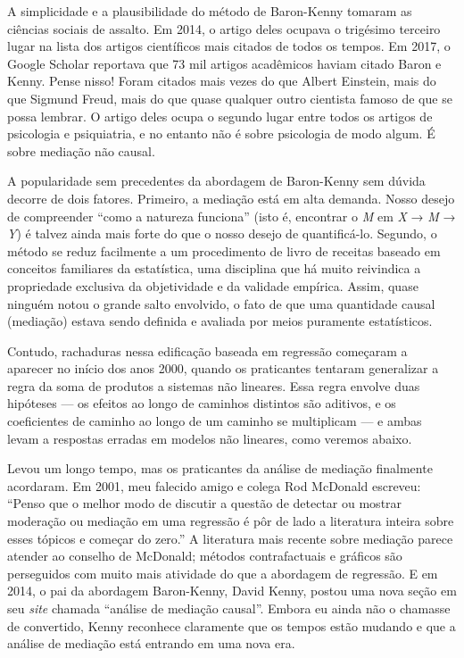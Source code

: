 \documentclass[11pt,a5paper,twoside]{book}
\begin{document}
A simplicidade e a plausibilidade do método de Baron-Kenny tomaram as ciências sociais de assalto. Em 2014, o artigo deles ocupava o trigésimo terceiro lugar na lista dos artigos científicos mais citados de todos os tempos. Em 2017, o Google Scholar reportava que 73 mil artigos acadêmicos haviam citado Baron e Kenny. Pense nisso! Foram citados mais vezes do que Albert Einstein, mais do que Sigmund Freud, mais do que quase qualquer outro cientista famoso de que se possa lembrar. O artigo deles ocupa o segundo lugar entre todos os artigos de psicologia e psiquiatria, e no entanto não é sobre psicologia de modo algum. É sobre mediação não causal.

A popularidade sem precedentes da abordagem de Baron-Kenny sem dúvida decorre de dois fatores. Primeiro, a mediação está em alta demanda. Nosso desejo de compreender “como a natureza funciona” (isto é, encontrar o \textit{M} em \textit{X} → \textit{M} → \textit{Y}) é talvez ainda mais forte do que o nosso desejo de quantificá-lo. Segundo, o método se reduz facilmente a um procedimento de livro de receitas baseado em conceitos familiares da estatística, uma disciplina que há muito reivindica a propriedade exclusiva da objetividade e da validade empírica. Assim, quase ninguém notou o grande salto envolvido, o fato de que uma quantidade causal (mediação) estava sendo definida e avaliada por meios puramente estatísticos.

Contudo, rachaduras nessa edificação baseada em regressão começaram a aparecer no início dos anos 2000, quando os praticantes tentaram generalizar a regra da soma de produtos a sistemas não lineares. Essa regra envolve duas hipóteses — os efeitos ao longo de caminhos distintos são aditivos, e os coeficientes de caminho ao longo de um caminho se multiplicam — e ambas levam a respostas erradas em modelos não lineares, como veremos abaixo.

Levou um longo tempo, mas os praticantes da análise de mediação finalmente acordaram. Em 2001, meu falecido amigo e colega Rod McDonald escreveu: “Penso que o melhor modo de discutir a questão de detectar ou mostrar moderação ou mediação em uma regressão é pôr de lado a literatura inteira sobre esses tópicos e começar do zero.” A literatura mais recente sobre mediação parece atender ao conselho de McDonald; métodos contrafactuais e gráficos são perseguidos com muito mais atividade do que a abordagem de regressão. E em 2014, o pai da abordagem Baron-Kenny, David Kenny, postou uma nova seção em seu \textit{site} chamada “análise de mediação causal”. Embora eu ainda não o chamasse de convertido, Kenny reconhece claramente que os tempos estão mudando e que a análise de mediação está entrando em uma nova era.
\end{document}
